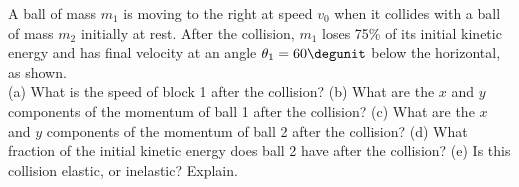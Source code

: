 A ball of mass $m_1$ is moving to the right at speed $v_0$ when it
collides with a ball of mass $m_2$ initially at rest. After the
collision, $m_1$ loses 75\% of its initial kinetic energy and has
final velocity at an angle $\theta_1 = 60\degunit$ below the
horizontal, as shown.\\
%
(a) What is the speed of block 1 after the collision?\answercheck\hwendpart
%
(b) What are the $x$ and $y$ components of the momentum of ball 1
after the collision?\answercheck\hwendpart
%
(c) What are the $x$ and $y$ components of the momentum of ball 2
after the collision?\answercheck\hwendpart
%
(d) What fraction of the initial kinetic energy does ball 2 have
after the collision?\answercheck\hwendpart
%
(e) Is this collision elastic, or inelastic? Explain.
